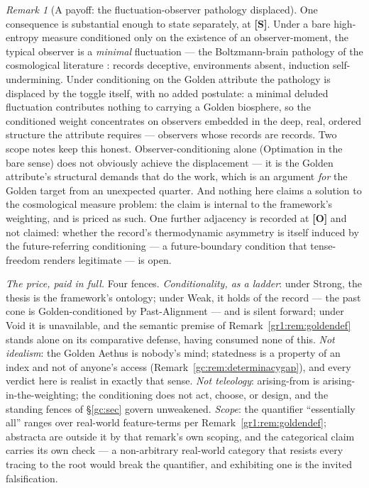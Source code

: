 \documentclass[11pt]{article}
\numberwithin{equation}{section}
\theoremstyle{plain}
\theoremstyle{definition}
\theoremstyle{remark}
\newtheorem{remark}[theorem]{Remark}
\begin{document}
\begin{remark}[A payoff: the fluctuation-observer pathology displaced]
\label{to:rem:boltzbrains}
One consequence is substantial enough to state separately, at
\textbf{[S]}. Under a bare high-entropy measure conditioned only on
the existence of an observer-moment, the typical observer is a
\emph{minimal} fluctuation --- the Boltzmann-brain pathology of the
cosmological literature \cite{AS04,Car17}: records deceptive,
environments absent, induction self-undermining. Under conditioning on
the Golden attribute the pathology is displaced by the toggle itself,
with no added postulate: a minimal deluded fluctuation contributes
nothing to carrying a Golden biosphere, so the conditioned weight
concentrates on observers embedded in the deep, real, ordered
structure the attribute requires --- observers whose records are
records. Two scope notes keep this honest. Observer-conditioning alone
(Optimation in the bare sense) does not obviously achieve the
displacement --- it is the Golden attribute's structural demands that
do the work, which is an argument \emph{for} the Golden target from an
unexpected quarter. And nothing here claims a solution to the
cosmological measure problem: the claim is internal to the framework's
weighting, and is priced as such. One further adjacency is recorded at
\textbf{[O]} and not claimed: whether the record's thermodynamic
asymmetry is itself induced by the future-referring conditioning --- a
future-boundary condition that tense-freedom renders legitimate --- is
open.
\end{remark}

\emph{The price, paid in full.} Four fences. \emph{Conditionality,
as a ladder}: under Strong, the thesis is the framework's ontology;
under Weak, it holds of the record --- the past cone is
Golden-conditioned by Past-Alignment --- and is silent forward; under
Void it is unavailable, and the semantic premise of
Remark~\ref{gr1:rem:goldendef} stands alone on its comparative
defense, having consumed none of this. \emph{Not idealism}: the
Golden Aethus is nobody's mind; statedness is a property of an index
and not of anyone's access
(Remark~\ref{gc:rem:determinacygap}), and every verdict here is
realist in exactly that sense. \emph{Not teleology}: arising-from is
arising-in-the-weighting; the conditioning does not act, choose, or
design, and the standing fences of \S\ref{gc:sec} govern unweakened.
\emph{Scope}: the quantifier ``essentially all'' ranges over
real-world feature-terms per Remark~\ref{gr1:rem:goldendef};
abstracta are outside it by that remark's own scoping, and the
categorical claim carries its own check --- a non-arbitrary real-world
category that resists every tracing to the root would break the
quantifier, and exhibiting one is the invited falsification.
\end{document}
